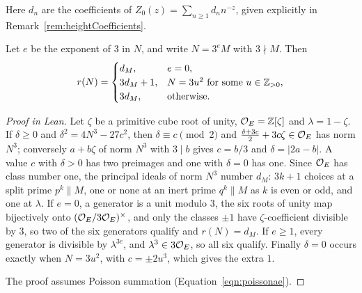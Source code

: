 \begin{lemma}

\label{lemma:traceZeroCoefficients}


\leanok

Here $d_n$ are the coefficients of $Z_0(z)=\sum_{n\geq1}d_nn^{-z}$, given explicitly in Remark~\ref{rem:heightCoefficients}.

 Let $e$ be the exponent of $3$ in $N$, and write $N=3^eM$ with $3\nmid M$. Then \[ r(N)= \begin{cases} d_M,&e=0,\\ 3d_M+1,&N=3u^2\text{ for some }u\in\mathbb{Z}_{>0},\\ 3d_M,&\text{otherwise}. \end{cases} \] 

\end{lemma}

\begin{proof}[Proof in Lean]

\leanok


Let $\zeta$ be a primitive cube root of unity, $\mathcal{O}_E=\mathbb{Z}[\zeta]$ and $\lambda=1-\zeta$. If $\delta\geq0$ and $\delta^2=4N^3-27c^2$, then $\delta\equiv c\pmod2$ and $\frac{\delta+3c}2+3c\zeta\in\mathcal{O}_E$ has norm $N^3$; conversely $a+b\zeta$ of norm $N^3$ with $3\mid b$ gives $c=b/3$ and $\delta=|2a-b|$. A value $c$ with $\delta>0$ has two preimages and one with $\delta=0$ has one. Since $\mathcal{O}_E$ has class number one, the principal ideals of norm $N^3$ number $d_M$: $3k+1$ choices at a split prime $p^k\parallel M$, one or none at an inert prime $q^k\parallel M$ as $k$ is even or odd, and one at $\lambda$. If $e=0$, a generator is a unit modulo $3$, the six roots of unity map bijectively onto $(\mathcal{O}_E/3\mathcal{O}_E)^\times$, and only the classes $\pm1$ have $\zeta$-coefficient divisible by $3$, so two of the six generators qualify and $r(N)=d_M$. If $e\geq1$, every generator is divisible by $\lambda^{3e}$, and $\lambda^3\in3\mathcal{O}_E$, so all six qualify. Finally $\delta=0$ occurs exactly when $N=3u^2$, with $c=\pm2u^3$, which gives the extra $1$.

The proof assumes Poisson summation (Equation~\ref{eqn:poissonae}).

\end{proof}

